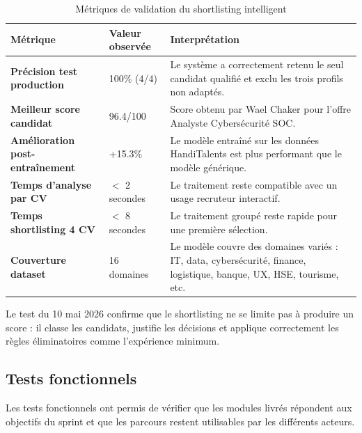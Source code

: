 \documentclass[12pt,a4paper]{report}
\newcommand{\tblhead}[1]{\cellcolor{darkblue}\color{white}\bfseries #1}
\newcommand{\tblleft}[1]{\bfseries\color{darkblue} #1}
\begin{document}
\renewcommand{\arraystretch}{1.25}
\begin{table}[H]
\centering
\begin{tabularx}{\textwidth}{|L{4cm}|L{3cm}|Y|}
\hline
\tblhead{Métrique} & \tblhead{Valeur observée} & \tblhead{Interprétation} \\
\hline
\tblleft{Précision test production} & 100\% (4/4) & Le système a correctement retenu le seul candidat qualifié et exclu les trois profils non adaptés. \\
\hline
\tblleft{Meilleur score candidat} & 96.4/100 & Score obtenu par Wael Chaker pour l'offre Analyste Cybersécurité SOC. \\
\hline
\tblleft{Amélioration post-entraînement} & +15.3\% & Le modèle entraîné sur les données HandiTalents est plus performant que le modèle générique. \\
\hline
\tblleft{Temps d'analyse par CV} & $<$ 2 secondes & Le traitement reste compatible avec un usage recruteur interactif. \\
\hline
\tblleft{Temps shortlisting 4 CV} & $<$ 8 secondes & Le traitement groupé reste rapide pour une première sélection. \\
\hline
\tblleft{Couverture dataset} & 16 domaines & Le modèle couvre des domaines variés : IT, data, cybersécurité, finance, logistique, banque, UX, HSE, tourisme, etc. \\
\hline
\end{tabularx}
\caption{Métriques de validation du shortlisting intelligent}
\label{tab:metriques-shortlisting}
\end{table}
\renewcommand{\arraystretch}{1}

\begin{infobox}
Le test du 10 mai 2026 confirme que le shortlisting ne se limite pas à produire un score : il classe les candidats, justifie les décisions et applique correctement les règles éliminatoires comme l'expérience minimum.
\end{infobox}

\subsection{Tests fonctionnels}

Les tests fonctionnels ont permis de vérifier que les modules livrés répondent aux objectifs du sprint et que les parcours restent utilisables par les différents acteurs.
\end{document}
